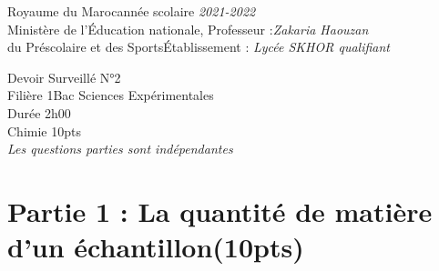 \documentclass[12pt]{article}
\newcommand\headerMe[2]{\noindent{}#1\hfill#2}
\begin{document}
\headerMe{Royaume du Maroc}{année scolaire \emph{2021-2022}}\\
\headerMe{Ministère de l'Éducation nationale, }{  Professeur :\emph{Zakaria Haouzan}}\\
\headerMe{du Préscolaire et des Sports}{Établissement : \emph{Lycée SKHOR qualifiant}}\\

\begin{center}
Devoir Surveillé  N°2 \\
    Filière 1Bac Sciences Expérimentales\\
Durée 2h00
\\
    \vspace{.2cm}
\hrulefill
\Large{Chimie 10pts}
\hrulefill\\

    \emph{Les questions parties sont indépendantes}
\end{center}

 \section*{Partie 1 : La quantité de matière d'un échantillon\dotfill(10pts) }
\end{document}
